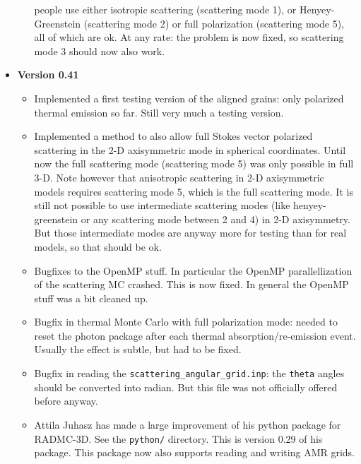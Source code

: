 \documentclass{report}
\begin{document}
\begin{itemize}
\begin{itemize}
    people use either isotropic scattering (scattering mode 1), or
    Henyey-Greenstein (scattering mode 2) or full polarization (scattering
    mode 5), all of which are ok. At any rate: the problem is now fixed,
    so scattering mode 3 should now also work.
  \end{itemize}
\item {\bf Version 0.41}\\
  \begin{itemize}
    \item Implemented a first testing version of the aligned grains:
      only polarized thermal emission so far. Still very much a testing
      version.
    \item Implemented a method to also allow full Stokes vector polarized
      scattering in the 2-D axisymmetric mode in spherical
      coordinates. Until now the full scattering mode (scattering mode 5)
      was only possible in full 3-D. Note however that anisotropic
      scattering in 2-D axisymmetric models requires scattering mode 5,
      which is the full scattering mode.  It is still not possible to use
      intermediate scattering modes (like henyey-greenstein or any
      scattering mode between 2 and 4) in 2-D axisymmetry. But those
      intermediate modes are anyway more for testing than for real models,
      so that should be ok.
    \item Bugfixes to the OpenMP stuff. In particular the OpenMP 
      parallellization of the scattering MC crashed. This is now fixed.
      In general the OpenMP stuff was a bit cleaned up.
    \item Bugfix in thermal Monte Carlo with full polarization mode: needed
      to reset the photon package after each thermal absorption/re-emission
      event. Usually the effect is subtle, but had to be fixed.
    \item Bugfix in reading the {\small\tt scattering\_angular\_grid.inp}:
      the {\small\tt theta} angles should be converted into radian. But
      this file was not officially offered before anyway. 
    \item Attila Juhasz has made a large improvement of his python package
      for RADMC-3D. See the {\small\tt python/} directory. This is version
      0.29 of his package. This package now also supports reading and
      writing AMR grids.
  \end{itemize}
\end{itemize}
\end{document}
